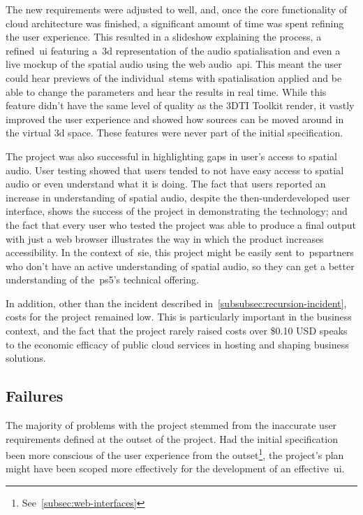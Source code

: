 The new requirements were adjusted to well, and, once the core functionality of cloud architecture was finished,
a significant amount of time was spent refining the user experience.
This resulted in a slideshow explaining the process,
a refined~\gls{ui} featuring a~\gls{3d} representation of the audio spatialisation and even a live mockup of the spatial audio
using the web audio~\gls{api}.
This meant the user could hear previews of the individual~\glspl{stem} with spatialisation applied
and be able to change the parameters and hear the results in real time.
While this feature didn't have the same level of quality as the 3DTI Toolkit render,
it vastly improved the user experience and showed how sources can be moved around in the virtual 3d space.
These features were never part of the initial specification.

The project was also successful in highlighting gaps in user's access to spatial audio.
User testing showed that users tended to not have easy access to spatial audio or even understand what it is doing.
The fact that users reported an increase in understanding of spatial audio,
despite the then-underdeveloped user interface, shows the success of the project in demonstrating the technology;
and the fact
that every user who tested the project was able
to produce a final output with just a web browser illustrates the way in which the product increases accessibility.
In the context of~\gls{sie},
this project might be easily sent
to~\glspl{pspartner} who don't have an active understanding of spatial audio,
so they can get a better understanding of the~\gls{ps5}'s technical offering.

In addition, other than the incident described in~\ref{subsubsec:recursion-incident},
costs for the project remained low.
This is particularly important in the business context,
and the fact that the project rarely raised costs over \$0.10 USD speaks to the economic efficacy of public cloud services
in hosting and shaping business solutions.

\subsection{Failures}\label{subsec:failures}

The majority of problems with the project stemmed from the inaccurate user requirements
defined at the outset of the project.
Had the initial specification been more conscious of the user experience from the outset\footnote{See~\ref{subsec:web-interfaces}},
the project's plan might have been scoped more effectively for the development of an effective~\gls{ui}.

